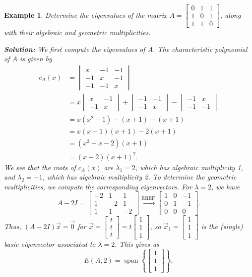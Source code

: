 \documentclass[12pt,letterpaper]{article}
\newtheorem{eg}[theorem]{Example}
\newenvironment{example}{\begin{eg}\rm}{\end{eg}}
\newcommand{\bbm}{\begin{bmatrix}}
\newcommand{\ebm}{\end{bmatrix}}
\begin{document}
\begin{example}
 Determine the eigenvalues of the matrix $A = \bbm 0&1&1\\1&0&1\\1&1&0\ebm$, along with their algebraic and geometric multiplicities.

\medskip

\textbf{Solution:} We first compute the eigenvalues of $A$. The characteristic polynomial of $A$ is given by
\begin{align*}
 c_A(x) & = \begin{vmatrix}x&-1&-1\\-1&x&-1\\-1&-1&x\end{vmatrix}\\
 & = x\begin{vmatrix}x&-1\\-1&x\end{vmatrix}+\begin{vmatrix}-1&-1\\-1&x\end{vmatrix}-\begin{vmatrix}-1&x\\-1&-1\end{vmatrix}\\
 & = x(x^2-1)-(x+1)-(x+1)\\
 & = x(x-1)(x+1)-2(x+1)\\
 & = (x^2-x-2)(x+1)\\
 & = (x-2)(x+1)^2.
\end{align*}
We see that the roots of $c_A(x)$ are $\lambda_1 = 2$, which has algebraic multiplicity 1, and $\lambda_2 = -1$, which has algebraic multiplicity 2. To determine the geometric multiplicities, we compute the corresponding eigenvectors. For $\lambda = 2$, we have
\[
 A-2I = \bbm -2&1&1\\1&-2&1\\1&1&-2\ebm \xrightarrow{\text{RREF}} \bbm 1&0&-1\\0&1&-1\\0&0&0\ebm.
\]
Thus, $(A-2I)\vec{x} = \vec{0}$ for $\vec{x} = \bbm t\\t\\t\ebm = t\bbm 1\\1\\1\ebm$, so $\vec{x}_1 = \bbm 1\\1\\1\ebm$ is the (single) basic eigenvector associated to $\lambda = 2$. This gives us
\[
 E(A,2) = \operatorname{span}\left\{\bbm 1\\1\\1\ebm\right\},
\]
\end{example}
\end{document}
